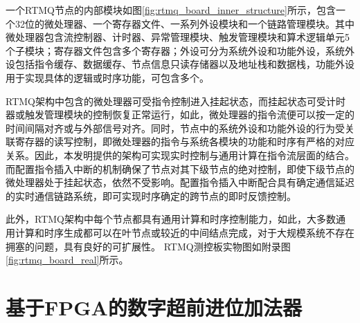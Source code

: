 一个RTMQ节点的内部模块如图\ref{fig:rtmq_board_inner_structure}所示，包含一个32位的微处理器、一个寄存器文件、一系列外设模块和一个链路管理模块。其中微处理器包含流控制器、计时器、异常管理模块、触发管理模块和算术逻辑单元5个子模块；寄存器文件包含多个寄存器；外设可分为系统外设和功能外设，系统外设包括指令缓存、数据缓存、节点信息只读存储器以及地址栈和数据栈，功能外设用于实现具体的逻辑或时序功能，可包含多个。

RTMQ架构中包含的微处理器可受指令控制进入挂起状态，而挂起状态可受计时器或触发管理模块的控制恢复正常运行，如此，微处理器的指令流便可以按一定的时间间隔对齐或与外部信号对齐。同时，节点中的系统外设和功能外设的行为受关联寄存器的读写控制，即微处理器的指令与系统各模块的功能和时序有严格的对应关系。因此，本发明提供的架构可实现实时控制与通用计算在指令流层面的结合。
而配置指令插入中断的机制确保了节点对其下级节点的绝对控制，即使下级节点的微处理器处于挂起状态，依然不受影响。配置指令插入中断配合具有确定通信延迟的实时通信链路系统，即可实现时序确定的跨节点的即时反馈控制。

此外，RTMQ架构中每个节点都具有通用计算和时序控制能力，如此，大多数通用计算和时序生成都可以在叶节点或较近的中间结点完成，对于大规模系统不存在拥塞的问题，具有良好的可扩展性。
RTMQ测控板实物图如附录图\ref{fig:rtmq_board_real}所示。






\section[基于FPGA的数字超前进位加法器]{基于FPGA的数字超前进位加法器}

